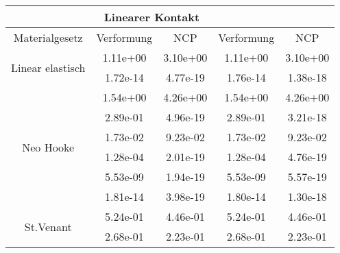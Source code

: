 \begin{table} 
\centering 
\begin{tabular}{c|cc|cc|} 
\cline{2-5} 
 & \multicolumn{2}{|c|}{Linearer Kontakt} &  \\ 
\hline 
\multicolumn{1}{|c|}{Materialgesetz} & \multicolumn{1}{c|}{Verformung} & \multicolumn{1}{c|}{NCP} & \multicolumn{1}{c|}{Verformung} & \multicolumn{1}{c|}{NCP} \\ 
\hline 
\multicolumn{1}{|c|}{\multirow{2}{*}{Linear elastisch}} &\multicolumn{1}{|c|}{  1.11e+00} & \multicolumn{1}{|c|}{  3.10e+00} & \multicolumn{1}{|c|}{  1.11e+00} & \multicolumn{1}{|c|}{  3.10e+00} \\ 
\multicolumn{1}{|c|}{} & \multicolumn{1}{|c|}{  1.72e-14} & \multicolumn{1}{|c|}{  4.77e-19} & \multicolumn{1}{|c|}{  1.76e-14} & \multicolumn{1}{|c|}{  1.38e-18} \\ 
\hline 
\multicolumn{1}{|c|}{\multirow{6}{*}{Neo Hooke}} &\multicolumn{1}{|c|}{  1.54e+00} & \multicolumn{1}{|c|}{  4.26e+00} & \multicolumn{1}{|c|}{  1.54e+00} & \multicolumn{1}{|c|}{  4.26e+00} \\ 
\multicolumn{1}{|c|}{} & \multicolumn{1}{|c|}{  2.89e-01} & \multicolumn{1}{|c|}{  4.96e-19} & \multicolumn{1}{|c|}{  2.89e-01} & \multicolumn{1}{|c|}{  3.21e-18} \\ 
\multicolumn{1}{|c|}{} & \multicolumn{1}{|c|}{  1.73e-02} & \multicolumn{1}{|c|}{  9.23e-02} & \multicolumn{1}{|c|}{  1.73e-02} & \multicolumn{1}{|c|}{  9.23e-02} \\ 
\multicolumn{1}{|c|}{} & \multicolumn{1}{|c|}{  1.28e-04} & \multicolumn{1}{|c|}{  2.01e-19} & \multicolumn{1}{|c|}{  1.28e-04} & \multicolumn{1}{|c|}{  4.76e-19} \\ 
\multicolumn{1}{|c|}{} & \multicolumn{1}{|c|}{  5.53e-09} & \multicolumn{1}{|c|}{  1.94e-19} & \multicolumn{1}{|c|}{  5.53e-09} & \multicolumn{1}{|c|}{  5.57e-19} \\ 
\multicolumn{1}{|c|}{} & \multicolumn{1}{|c|}{  1.81e-14} & \multicolumn{1}{|c|}{  3.98e-19} & \multicolumn{1}{|c|}{  1.80e-14} & \multicolumn{1}{|c|}{  1.30e-18} \\ 
\hline 
\multicolumn{1}{|c|}{\multirow{26}{*}{St.Venant}} &\multicolumn{1}{|c|}{  5.24e-01} & \multicolumn{1}{|c|}{  4.46e-01} & \multicolumn{1}{|c|}{  5.24e-01} & \multicolumn{1}{|c|}{  4.46e-01} \\ 
\multicolumn{1}{|c|}{} & \multicolumn{1}{|c|}{  2.68e-01} & \multicolumn{1}{|c|}{  2.23e-01} & \multicolumn{1}{|c|}{  2.68e-01} & \multicolumn{1}{|c|}{  2.23e-01} \\ 

\end{tabular}
\end{table}

